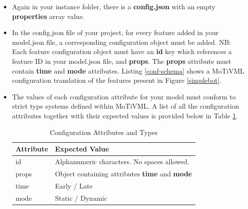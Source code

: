 \documentclass{article}
\begin{document}
\begin{itemize}
	\item Again in your instance folder, there is a \textbf{config.json} with an empty \textbf{properties} array value.
	
	\item In the config.json file of your project, for every feature added in your model.json file, a corresponding configuration object must be added. NB: Each feature configuration object must have an \textbf{id} key which references a feature ID in your model.json file, and \textbf{props}. The \textbf{props} attribute must contain \textbf{time} and \textbf{mode} attributes.  Listing \ref{conf-schema} shows a MoTiVML configuration translation of the features present in Figure \ref{simplebot}.
	
	\item The values of each configuration attribute for your model must conform to strict type systems defined within MoTiVML. A list of all the configuration attributes together with their expected values is provided below in Table \ref{tab:confvalueTypes}.
	
	\begin{table}[H]
		\caption{Configuration Attributes and Types}
		\begin{tabular}{|l|p{10cm}|}
			\hline
			Attribute & Expected Value \\\hline
			id & Alphanumeric characters. No spaces allowed.   \\ \hline
			props & Object containing attributes \textbf{time} and \textbf{mode} \\ \hline
			time & Early / Late  \\ \hline
			mode & Static / Dynamic \\ \hline
		\end{tabular}
		\label{tab:confvalueTypes}
	\end{table}
	
\end{itemize}
\end{document}
